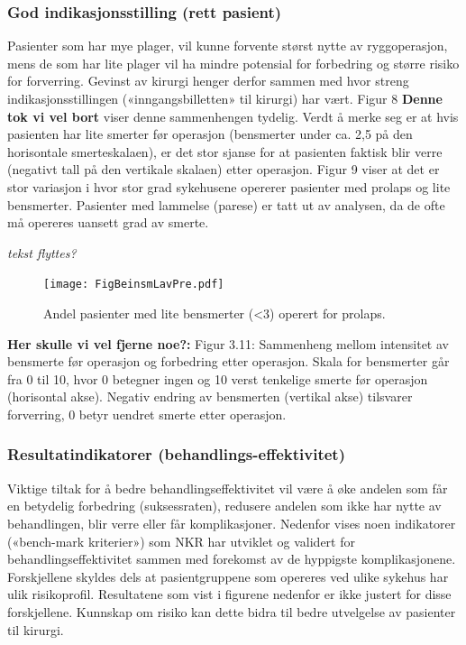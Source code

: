 \documentclass [norsk,a4paper,twoside]{article}\usepackage[]{graphicx}\usepackage[]{color}
\begin{document}
\subsubsection{God indikasjonsstilling (rett pasient)}



Pasienter som har mye plager, vil kunne forvente størst nytte av ryggoperasjon,
mens de som har lite plager vil ha mindre potensial for forbedring og større risiko
for forverring. Gevinst av kirurgi henger derfor sammen med hvor streng
indikasjonsstillingen («inngangsbilletten» til kirurgi) har vært. Figur 8 \textbf{Denne tok vi vel bort} viser denne
sammenhengen tydelig. Verdt å merke seg er at hvis pasienten har lite smerter før
operasjon (bensmerter under ca. 2,5 på den horisontale smerteskalaen), er det stor
sjanse for at pasienten faktisk blir verre (negativt tall på den vertikale skalaen) etter
operasjon. Figur 9 viser at det er stor variasjon i hvor stor grad sykehusene opererer
pasienter med prolaps og lite bensmerter. Pasienter med lammelse (parese) er tatt
ut av analysen, da de ofte må opereres uansett grad av smerte.

\textit{tekst flyttes?}

\begin{figure}[ht]
\centering \texttt{[image: FigBeinsmLavPre.pdf]}
\caption{\label{fig:BeinsmLavPre}  Andel pasienter med lite bensmerter (<3) operert for prolaps.}
\end{figure}

\textbf{Her skulle vi vel fjerne noe?:}
Figur 3.11: Sammenheng mellom intensitet av bensmerte før operasjon og
forbedring etter operasjon. Skala for bensmerter går fra 0 til 10, hvor 0 betegner
ingen og 10 verst tenkelige smerte før operasjon (horisontal akse). Negativ endring
av bensmerten (vertikal akse) tilsvarer forverring, 0 betyr uendret smerte etter
operasjon.





\subsubsection{Resultatindikatorer (behandlings-effektivitet)}
Viktige tiltak for å bedre behandlingseffektivitet vil være å øke andelen som får en
betydelig forbedring (suksessraten), redusere andelen som ikke har nytte av
behandlingen, blir verre eller får komplikasjoner. Nedenfor vises noen indikatorer
(«bench-mark kriterier») som NKR har utviklet og validert for
behandlingseffektivitet sammen med forekomst av de hyppigste komplikasjonene.
Forskjellene skyldes dels at pasientgruppene som opereres ved ulike sykehus har
ulik risikoprofil. Resultatene som vist i figurene nedenfor er ikke justert for disse
forskjellene. Kunnskap om risiko kan dette bidra til bedre utvelgelse av pasienter til
kirurgi.
\end{document}

